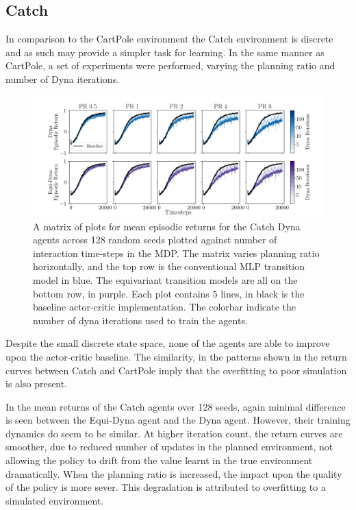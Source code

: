 \subsection{Catch}
In comparison to the CartPole environment the Catch environment is discrete and as such may provide a simpler task for learning.
In the same manner as CartPole, a set of experiments were performed, varying the planning ratio and number of Dyna iterations.
\begin{figure}[h!]
	\centering
	\includegraphics[width=\textwidth]{Figures/dyna_sweep_catch.png}
	\caption{A matrix of plots for mean episodic returns for the Catch Dyna agents across 128 random seeds
		plotted against number of interaction time-steps in the MDP. The matrix varies planning ratio horizontally, and the top row is the conventional MLP transition model in blue. The equivariant transition models are all on the bottom row, in purple. Each plot contains 5 lines, in black is the baseline actor-critic implementation. The colorbar indicate the number of dyna iterations used to train the agents.}
	\label{fig:catch_dyna}
\end{figure}
Despite the small discrete state space, none of the agents are able to improve upon the actor-critic baseline. The similarity, in the patterns shown in the return curves between Catch and CartPole imply that the overfitting to poor simulation is also present.

In the mean returns of the Catch agents over 128 seeds, again minimal difference is seen between the Equi-Dyna agent and the Dyna agent. However, their training dynamics do seem to be similar. At higher iteration count, the return curves are smoother, due to reduced number of updates in the planned environment, not allowing the policy to drift from the value learnt in the true environment dramatically. When the planning ratio is increased, the impact upon the quality of the policy is more sever. This degradation is attributed to overfitting to a simulated environment.

